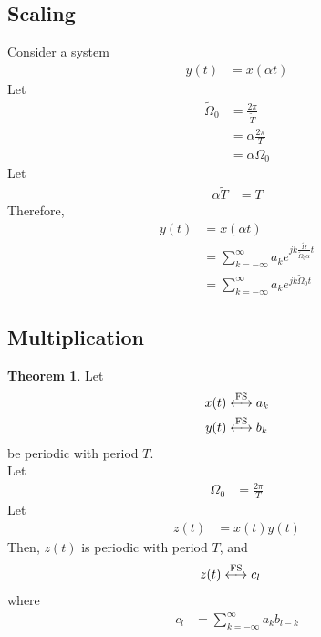 \documentclass[titlepage, fleqn, a4paper, 12pt, twoside]{article}
\theoremstyle{definition}
\theoremstyle{theorem}
\newtheorem{theorem}{Theorem}
\newcommand{\FS}{\xleftrightarrow{\mathrm{FS}}}
\renewcommand{\tilde}{\widetilde}
\begin{document}
\subsection{Scaling}

Consider a system
\begin{align*}
	y(t) &= x(\alpha t)
\end{align*}
Let
\begin{align*}
	\tilde{\Omega}_0 &= \frac{2 \pi}{\tilde{T}}\\
	&= \alpha \frac{2 \pi}{T}\\
	&= \alpha \Omega_0
\end{align*}
Let
\begin{align*}
	\alpha \tilde{T} &= T
\end{align*}
Therefore,
\begin{align*}
	y(t) &= x(\alpha t)\\
	&= \sum\limits_{k = -\infty}^{\infty} a_k e^{j k \frac{\tilde{\Omega}}{\tilde{\Omega}_0 \alpha} t}\\
	&= \sum\limits_{k = -\infty}^{\infty} a_k e^{j k \tilde{\Omega}_0 t}
\end{align*}

\subsection{Multiplication}

\begin{theorem}
	Let
	\begin{align*}
		x(t) &\FS a_k\\
		y(t) &\FS b_k
	\end{align*}
	be periodic with period $T$.\\
	Let
	\begin{align*}
		\Omega_0 &= \frac{2 \pi}{T}
	\end{align*}
	Let
	\begin{align*}
		z(t) &= x(t) y(t)
	\end{align*}
	Then, $z(t)$ is periodic with period $T$, and
	\begin{align*}
		z(t) &\FS c_l
	\end{align*}
	where
	\begin{align*}
		c_l &= \sum\limits_{k = -\infty}^{\infty} a_k b_{l - k}
	\end{align*}
\end{theorem}
\end{document}
